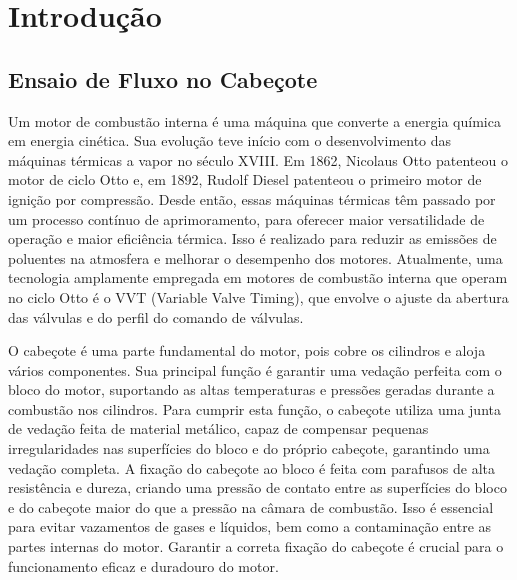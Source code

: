 \chapter{Introdução}

\section{Ensaio de Fluxo no Cabeçote}

Um motor de combustão interna é uma máquina que converte a energia química em energia cinética. 
Sua evolução teve início com o desenvolvimento das máquinas térmicas a vapor no século XVIII. 
Em 1862, Nicolaus Otto patenteou o motor de ciclo Otto e, em 1892, Rudolf Diesel patenteou o primeiro motor de ignição por compressão.
Desde então, essas máquinas térmicas têm passado por um processo contínuo de aprimoramento, para oferecer maior versatilidade de operação e maior eficiência térmica. 
Isso é realizado para reduzir as emissões de poluentes na atmosfera e melhorar o desempenho dos motores. 
Atualmente, uma tecnologia amplamente empregada em motores de combustão interna que operam no ciclo Otto é o VVT (Variable Valve Timing), que envolve o ajuste da abertura das válvulas e do perfil do comando de válvulas.

O cabeçote é uma parte fundamental do motor, pois cobre os cilindros e aloja vários componentes. 
Sua principal função é garantir uma vedação perfeita com o bloco do motor, suportando as altas temperaturas e pressões geradas durante a combustão nos cilindros. 
Para cumprir esta função, o cabeçote utiliza uma junta de vedação feita de material metálico, capaz de compensar pequenas irregularidades nas superfícies do bloco e do próprio cabeçote, garantindo uma vedação completa. 
A fixação do cabeçote ao bloco é feita com parafusos de alta resistência e dureza, criando uma pressão de contato entre as superfícies do bloco e do cabeçote maior do que a pressão na câmara de combustão. 
Isso é essencial para evitar vazamentos de gases e líquidos, bem como a contaminação entre as partes internas do motor. Garantir a correta fixação do cabeçote é crucial para o funcionamento eficaz e duradouro do motor.

